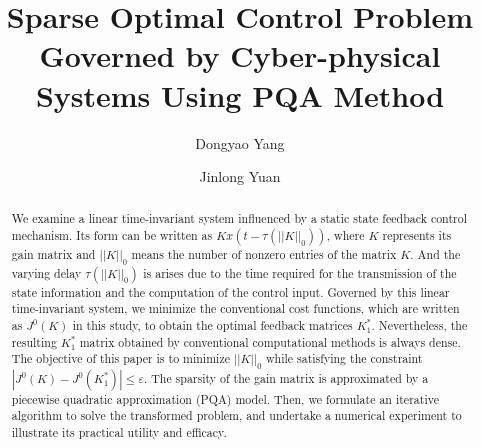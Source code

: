 \documentclass[12pt]{llncs}
\begin{document}
\fi
%
\title{Sparse Optimal Control Problem Governed by Cyber-physical Systems Using PQA Method}
\author{Dongyao Yang  \and  Jinlong Yuan
}


\maketitle

\begin{abstract}
We examine a linear time-invariant system influenced by a static state feedback control mechanism. Its form can be written as $Kx(t-\tau(||K||_0))$, where $K$ represents its gain matrix and $||K||_0$ means the number of nonzero entries of the matrix $K$. And the varying delay $\tau(||K||_0)$ is arises due to the time required for the transmission of the state information and the computation of the control input. Governed by this linear time-invariant system, we minimize the conventional cost functions, which are written as $J^{0}(K)$ in this study, to obtain the optimal feedback matrices $K_1^{*}$. Nevertheless, the resulting $K_1^{*}$ matrix obtained by conventional computational methods is always dense.
The objective of this paper is to minimize $||K||_0$ while satisfying the constraint $|J^{0}(K)-J^{0}(K_1^{*})|\leq \varepsilon$.
The sparsity of the gain matrix is approximated by a piecewise quadratic approximation (PQA) model.
Then, we formulate an iterative algorithm to solve the transformed problem, and undertake a numerical experiment to illustrate its practical utility and efficacy.
\end{abstract}




\end{document}
